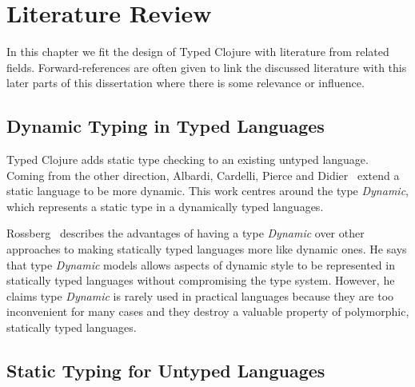 
\chapter{Literature Review}

In this chapter we fit the design of Typed Clojure with literature from related fields.
Forward-references are often given to link the discussed literature with this later parts
of this dissertation
where there is some relevance or influence.


\section{Dynamic Typing in Typed Languages}

Typed Clojure adds static type checking to an existing untyped language.
Coming from the other direction, Albardi, Cardelli, Pierce and Didier~\cite{ACPR94}
extend a static language to be more dynamic.
This work centres around the type \emph{Dynamic}, which represents
a static type in a dynamically typed languages.

Rossberg~\cite{Ros07} describes the advantages of having a type
\emph{Dynamic} over other approaches to making statically typed languages
more like dynamic ones. He says that type \emph{Dynamic} models
allows aspects of dynamic style to be represented in statically
typed languages without compromising the type system.
However, he claims type \emph{Dynamic} is rarely used in practical languages
because they are too inconvenient for many cases and they destroy
a valuable property of polymorphic, statically typed languages.


\section{Static Typing for Untyped Languages}

